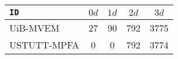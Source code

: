 \documentclass{article}
\begin{document}
\begin{table}
    \centering
    \begin{tabular}{|l|cccc|}
        \hline
        \texttt{ID} & $0d$ & $1d$ & $2d$ & $3d$ \\ \hline
        UiB-MVEM & 27 & 90 & 792 & 3775 \\ \hline
        USTUTT-MPFA & 0 & 0 & 792 & 3774 \\ \hline
    \end{tabular}
\end{table}
\end{document}
